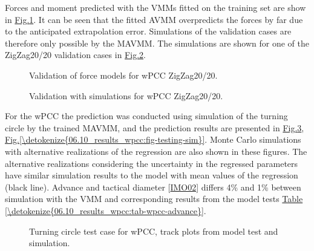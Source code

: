 \documentclass[review]{elsarticle}
\begin{document}
\sphinxAtStartPar
Forces and moment predicted with the VMMs fitted on the training set are show in \hyperref[\detokenize{06.10_results_wpcc:fig-validation-forces}]{Fig.\@ \ref{\detokenize{06.10_results_wpcc:fig-validation-forces}}}. It can be seen that the fitted AVMM overpredicts the forces by far due to the anticipated extrapolation error. Simulations of the validation cases are therefore only possible by the MAVMM. The simulations are shown for one of the ZigZag20/20 validation cases in \hyperref[\detokenize{06.10_results_wpcc:fig-validation-sim}]{Fig.\@ \ref{\detokenize{06.10_results_wpcc:fig-validation-sim}}}.

\begin{figure}[H]
\centering
\capstart

\noindent{}
\caption{Validation of force models for wPCC ZigZag20/20.}\label{\detokenize{06.10_results_wpcc:fig-validation-forces}}\end{figure}

\begin{figure}[H]
\centering
\capstart

\noindent{}
\caption{Validation with simulations for wPCC ZigZag20/20.}\label{\detokenize{06.10_results_wpcc:fig-validation-sim}}\end{figure}

\sphinxAtStartPar
For the wPCC the prediction was conducted using simulation of the turning circle by the trained MAVMM, and the prediction results are presented in \hyperref[\detokenize{06.10_results_wpcc:fig-track-plot-testing-sim}]{Fig.\@ \ref{\detokenize{06.10_results_wpcc:fig-track-plot-testing-sim}}}, \hyperref[\detokenize{06.10_results_wpcc:fig-testing-sim}]{Fig.\@ \ref{\detokenize{06.10_results_wpcc:fig-testing-sim}}}. Monte Carlo simulations with alternative realizations of the regression are also shown in these figures. The alternative realizations considering the uncertainty in the regressed parameters have similar simulation results to the model with mean values of the regression (black line). 
Advance and tactical diameter {[}\hyperlink{cite.bibligraphy:id16}{IMO02}{]} differs 4\% and 1\% between simulation with the VMM and corresponding results from the model tests \hyperref[\detokenize{06.10_results_wpcc:tab-wpcc-advance}]{Table \ref{\detokenize{06.10_results_wpcc:tab-wpcc-advance}}}.

\begin{figure}[H]
\centering
\capstart

\noindent{}
\caption{Turning circle test case for wPCC, track plots from model test and simulation.}\label{\detokenize{06.10_results_wpcc:fig-track-plot-testing-sim}}\end{figure}
\end{document}
